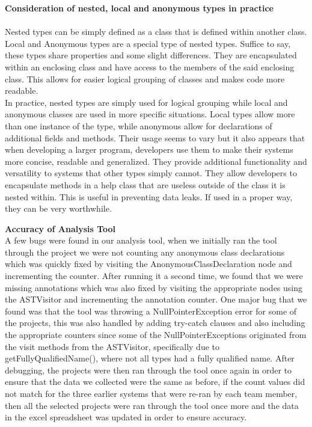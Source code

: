 \documentclass{assignment}
\begin{document}
\begin{enumerate}
\textbf{Consideration of nested, local and anonymous types in practice}\\
	\\Nested types can be simply defined as a class that is defined within another class. Local and Anonymous types are a special type of nested types. Suffice to say, these types share properties and some slight differences. They are encapsulated within an enclosing class and have access to the members of the said enclosing class. This allows for easier logical grouping of classes and makes code more readable. \\

	In practice, nested types are simply used for logical grouping while local and anonymous classes are used in more specific situations. Local types allow more than one instance of the type, while anonymous allow for declarations of additional fields and methods. Their usage seems to vary but it also appears that when developing a larger program, developers use them to make their systems more concise, readable and generalized. They provide additional functionality and versatility to systems that other types simply cannot. They allow developers to encapsulate methods in a help class that are useless outside of the class it is nested within. This is useful in preventing data leaks. If used in a proper way, they can be very worthwhile.

\textbf{Accuracy of Analysis Tool}\\

A few bugs were found in our analysis tool, when we initially ran the tool through the project we were not counting any anonymous class declarations which was quickly fixed by visiting the AnonymousClassDeclaration node and incrementing the counter. After running it a second time, we found that we were missing annotations which was also fixed by visiting the appropriate nodes using the ASTVisitor and incrementing the annotation counter. One major bug that we found was that the tool was throwing a NullPointerException error for some of the projects, this was also handled by adding try-catch clauses and also including the appropriate counters since some of the NullPointerExceptions originated from the visit methods from the ASTVisitor, specifically due to getFullyQualifiedName(), where not all types had a fully qualified name. After debugging, the projects were then ran through the tool once again in order to ensure that the data we collected were the same as before, if the count values did not match for the three earlier systems that were re-ran by each team member, then all the selected projects were ran through the tool once more and the data in the excel spreadsheet was updated in order to ensure accuracy.


\end{enumerate}
\end{document}
